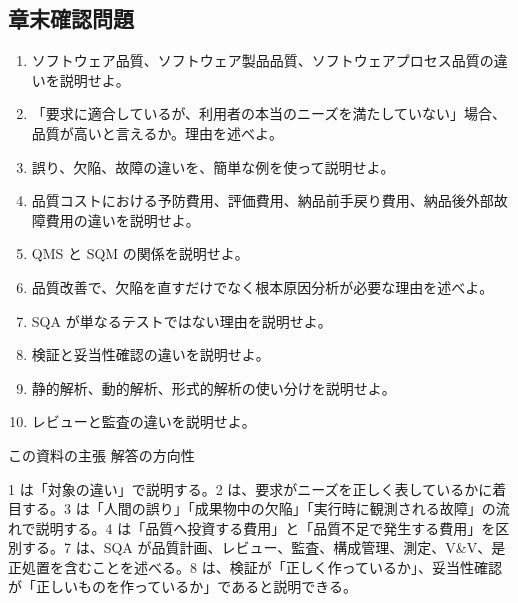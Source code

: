 \subsection{章末確認問題}
\begin{enumerate}
  \item ソフトウェア品質、ソフトウェア製品品質、ソフトウェアプロセス品質の違いを説明せよ。
  \item 「要求に適合しているが、利用者の本当のニーズを満たしていない」場合、品質が高いと言えるか。理由を述べよ。
  \item 誤り、欠陥、故障の違いを、簡単な例を使って説明せよ。
  \item 品質コストにおける予防費用、評価費用、納品前手戻り費用、納品後外部故障費用の違いを説明せよ。
  \item QMS と SQM の関係を説明せよ。
  \item 品質改善で、欠陥を直すだけでなく根本原因分析が必要な理由を述べよ。
  \item SQA が単なるテストではない理由を説明せよ。
  \item 検証と妥当性確認の違いを説明せよ。
  \item 静的解析、動的解析、形式的解析の使い分けを説明せよ。
  \item レビューと監査の違いを説明せよ。
\end{enumerate}

\begin{pointbox}{この資料の主張}
解答の方向性\par
1 は「対象の違い」で説明する。2 は、要求がニーズを正しく表しているかに着目する。3 は「人間の誤り」「成果物中の欠陥」「実行時に観測される故障」の流れで説明する。4 は「品質へ投資する費用」と「品質不足で発生する費用」を区別する。7 は、SQA が品質計画、レビュー、監査、構成管理、測定、V\&V、是正処置を含むことを述べる。8 は、検証が「正しく作っているか」、妥当性確認が「正しいものを作っているか」であると説明できる。
\end{pointbox}
